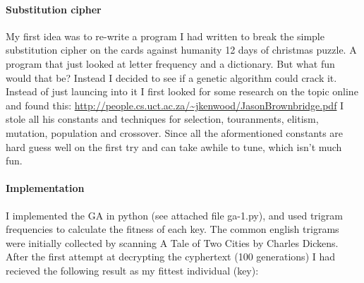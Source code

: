 \documentclass{article}
\begin{document}
\begin{enumerate}
  \paragraph{Substitution cipher}{My first idea was to re-write a program I had written to break the simple substitution cipher on the cards against humanity 12 days of christmas puzzle. A program that just looked at letter frequency and a dictionary. But what fun would that be? Instead I decided to see if a genetic algorithm could crack it. Instead of just launcing into it I first looked for some research on the topic online and found this: \url{http://people.cs.uct.ac.za/~jkenwood/JasonBrownbridge.pdf} I stole all his constants and techniques for selection, touranments, elitism, mutation, population and crossover. Since all the aformentioned constants are hard guess well on the first try and can take awhile to tune, which isn't much fun.}
  \paragraph{Implementation}{I implemented the GA in python (see attached file ga-1.py), and used trigram frequencies to calculate the fitness of each key. The common english trigrams were initially collected by scanning A Tale of Two Cities by Charles Dickens. After the first attempt at decrypting the cyphertext (100 generations) I had recieved the following result as my fittest individual (key):}


\end{enumerate}
\end{document}

